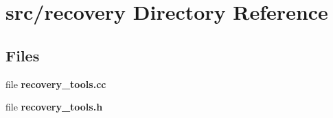 \section{src/recovery Directory Reference}
\label{dir_65bf857df52c5bb0cdbe90b3869de0ee}
\subsection*{Files}
\begin{DoxyCompactItemize}
\item 
file {\bf recovery\-\_\-tools.\-cc}
\item 
file {\bf recovery\-\_\-tools.\-h}
\end{DoxyCompactItemize}
